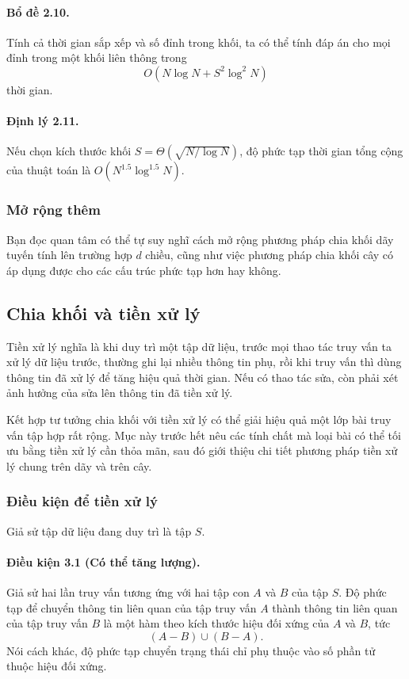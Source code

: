 \documentclass[11pt]{article}
\begin{document}
\paragraph{Bổ đề 2.10.}
Tính cả thời gian sắp xếp và số đỉnh trong khối, ta có thể tính đáp án cho
mọi đỉnh trong một khối liên thông trong
\[
  O(N\log N+S^2\log^2 N)
\]
thời gian.

\paragraph{Định lý 2.11.}
Nếu chọn kích thước khối \(S=\Theta(\sqrt{N/\log N})\), độ phức tạp thời gian
tổng cộng của thuật toán là \(O(N^{1.5}\log^{1.5}N)\).

\subsubsection{Mở rộng thêm}

Bạn đọc quan tâm có thể tự suy nghĩ cách mở rộng phương pháp chia khối dãy
tuyến tính lên trường hợp \(d\) chiều, cũng như việc phương pháp chia khối
cây có áp dụng được cho các cấu trúc phức tạp hơn hay không.

\subsection{Chia khối và tiền xử lý}

Tiền xử lý nghĩa là khi duy trì một tập dữ liệu, trước mọi thao tác truy vấn
ta xử lý dữ liệu trước, thường ghi lại nhiều thông tin phụ, rồi khi truy vấn
thì dùng thông tin đã xử lý để tăng hiệu quả thời gian. Nếu có thao tác sửa,
còn phải xét ảnh hưởng của sửa lên thông tin đã tiền xử lý.

Kết hợp tư tưởng chia khối với tiền xử lý có thể giải hiệu quả một lớp bài
truy vấn tập hợp rất rộng. Mục này trước hết nêu các tính chất mà loại bài có
thể tối ưu bằng tiền xử lý cần thỏa mãn, sau đó giới thiệu chi tiết phương
pháp tiền xử lý chung trên dãy và trên cây.

\subsubsection{Điều kiện để tiền xử lý}

Giả sử tập dữ liệu đang duy trì là tập \(S\).

\paragraph{Điều kiện 3.1 (Có thể tăng lượng).}
Giả sử hai lần truy vấn tương ứng với hai tập con \(A\) và \(B\) của tập
\(S\). Độ phức tạp để chuyển thông tin liên quan của tập truy vấn \(A\) thành
thông tin liên quan của tập truy vấn \(B\) là một hàm theo kích thước hiệu
đối xứng của \(A\) và \(B\), tức
\[
  (A-B)\cup(B-A).
\]
Nói cách khác, độ phức tạp chuyển trạng thái chỉ phụ thuộc vào số phần tử
thuộc hiệu đối xứng.
\end{document}
